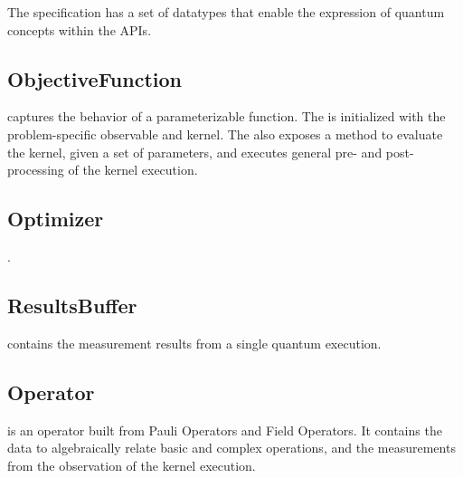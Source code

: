 The \qcor specification has a set of datatypes that enable the expression of quantum concepts within the \qcor \ac{API}s.\\

\subsection{\textbf{ObjectiveFunction}}\label{subsec:ObjectiveFunction}
 captures the behavior of a parameterizable function. The  is initialized with the problem-specific observable and kernel. The  also exposes a method to evaluate the kernel, given a set of parameters, and executes general pre- and post-processing of the kernel execution.\\

\subsection{\textbf{Optimizer}}\label{subsec:Optimizer}
 .\\


\subsection{\textbf{ResultsBuffer}}\label{subsec:ResultsBuffer}
 contains the measurement results from a single quantum execution.\\

\subsection{\textbf{Operator}}\label{subsec:Operator}
 is an operator built from Pauli Operators and Field Operators.
It contains the data to algebraically relate basic and complex operations, 
and the measurements from the observation of the kernel execution.\\

